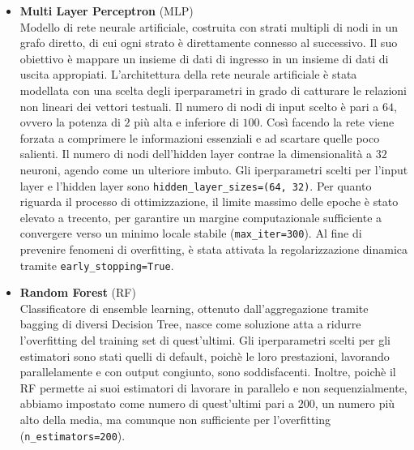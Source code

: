 \documentclass[12pt, a4paper, twoside]{article}
\numberwithin{table}{section}
\begin{document}
\begin{itemize}
        \item \textbf{Multi Layer Perceptron} (MLP) \\
        Modello di rete neurale artificiale, costruita con strati multipli di nodi in un grafo diretto, di cui ogni
        strato è direttamente connesso al successivo. Il suo obiettivo è mappare un insieme di dati di ingresso in un insieme
        di dati di uscita appropiati. L'architettura della rete neurale artificiale è stata modellata con una scelta degli
        iperparametri in grado di catturare le relazioni non lineari dei vettori testuali. Il numero di nodi di input 
        scelto è pari a $64$, ovvero la potenza di $2$ più alta e inferiore di $100$. Così facendo la rete viene forzata
        a comprimere le informazioni essenziali e ad scartare quelle poco salienti. Il numero di nodi dell'hidden layer 
        contrae la dimensionalità a $32$ neuroni, agendo come un ulteriore imbuto. Gli iperparametri scelti per l'input
        layer e l'hidden layer sono \texttt{hidden\_layer\_sizes=(64, 32)}. Per quanto riguarda il processo di ottimizzazione,
        il limite massimo delle epoche è stato elevato a trecento, per garantire un margine computazionale sufficiente a convergere
        verso un minimo locale stabile (\texttt{max\_iter=300}). Al fine di prevenire fenomeni di overfitting, è stata attivata
        la regolarizzazione dinamica tramite \texttt{early\_stopping=True}.

        \item \textbf{Random Forest} (RF) \\
        Classificatore di ensemble learning, ottenuto dall'aggregazione tramite bagging di diversi Decision Tree, nasce
        come soluzione atta a ridurre l'overfitting del training set di quest'ultimi. Gli iperparametri scelti per gli 
        estimatori sono stati quelli di default, poichè le loro prestazioni, lavorando parallelamente e con output 
        congiunto, sono soddisfacenti. Inoltre, poichè il RF permette ai suoi estimatori di lavorare in parallelo e non
        sequenzialmente, abbiamo impostato come numero di quest'ultimi pari a $200$, un numero più alto della media, ma
        comunque non sufficiente per l'overfitting (\texttt{n\_estimators=200}). 


\end{itemize}
\end{document}
